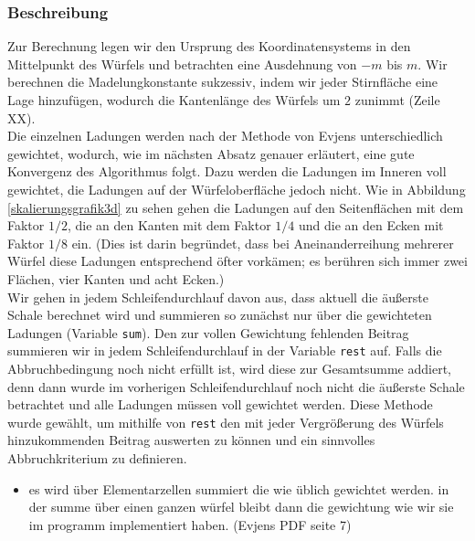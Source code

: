 \documentclass[10pt,a4paper]{article}
\begin{document}
\subsubsection{Beschreibung}
Zur Berechnung legen wir den Ursprung des Koordinatensystems in den Mittelpunkt des
Würfels und betrachten eine Ausdehnung von $-m$ bis $m$.
Wir berechnen die Madelungkonstante sukzessiv, indem wir jeder Stirnfläche eine Lage
hinzufügen, wodurch die Kantenlänge des Würfels um $2$ zunimmt (Zeile XX). \\
Die einzelnen Ladungen werden nach der Methode von
Evjens \cite{Evjen} unterschiedlich gewichtet, wodurch, wie im nächsten Absatz genauer
erläutert, eine gute Konvergenz des Algorithmus folgt. Dazu werden die Ladungen im
Inneren voll gewichtet, die Ladungen auf der Würfeloberfläche jedoch nicht. Wie in
Abbildung \ref{skalierungsgrafik3d} zu sehen gehen die Ladungen auf den Seitenflächen mit
dem Faktor $1/2$, die an den Kanten mit dem Faktor $1/4$ und die an den Ecken mit Faktor
$1/8$ ein. (Dies ist darin begründet, dass bei Aneinanderreihung mehrerer Würfel diese
Ladungen entsprechend öfter vorkämen; es berühren sich immer zwei Flächen, vier Kanten
und acht Ecken.)\\
Wir gehen in jedem Schleifendurchlauf davon aus, dass aktuell die äußerste Schale berechnet
wird und summieren so zunächst nur über die gewichteten Ladungen (Variable \texttt{sum}).
Den zur vollen Gewichtung fehlenden Beitrag summieren wir in jedem Schleifendurchlauf in der Variable
\texttt{rest} auf. Falls die Abbruchbedingung noch nicht erfüllt ist, wird diese zur
Gesamtsumme addiert, denn dann wurde im vorherigen Schleifendurchlauf noch nicht die
äußerste Schale betrachtet und alle Ladungen müssen voll gewichtet werden. Diese Methode
wurde gewählt, um mithilfe von \texttt{rest} den mit jeder Vergrößerung des Würfels
hinzukommenden Beitrag auswerten zu können und ein sinnvolles Abbruchkriterium zu definieren.

\begin{itemize}
\item es wird über Elementarzellen summiert die wie üblich gewichtet werden. in
der summe über einen ganzen würfel bleibt dann die gewichtung wie wir sie im
programm implementiert haben. (Evjens PDF seite 7)
\end{itemize}
\end{document}
